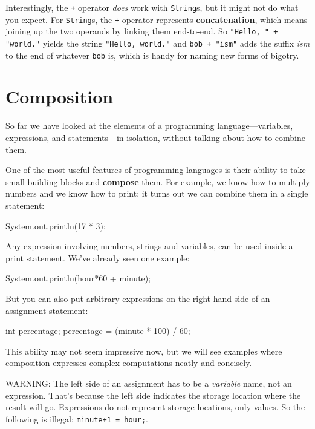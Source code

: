 
Interestingly, the {\tt +} operator {\em does} work with
{\tt String}s, but it might not do what you expect.
For {\tt String}s, the {\tt +} operator represents {\bf concatenation},
which means joining up the two operands by linking them
end-to-end.  So {\tt "Hello, " + "world."} yields the string
{\tt "Hello, world."} and {\tt bob + "ism"} adds the suffix
{\em ism} to the end of whatever {\tt bob} is, which is
handy for naming new forms of bigotry.


\section{Composition}

So far we have looked at the elements of a programming
language---variables, expressions, and statements---in
isolation, without talking about how to combine them.

One of the most useful features of programming languages
is their ability to take small building blocks and
{\bf compose} them.  For example, we know how to multiply
numbers and we know how to print; it turns out we can
combine them in a single statement:

\begin{code}
    System.out.println(17 * 3);
\end{code}
%
Any expression involving numbers, strings
and variables, can be used inside a print statement.  We've
already seen one example:

\begin{code}
    System.out.println(hour*60 + minute);
\end{code}
%
But you can also put arbitrary expressions on the right-hand
side of an assignment statement:

\begin{code}
    int percentage;
    percentage = (minute * 100) / 60;
\end{code}
%
This ability may not seem impressive now, but we will see
examples where composition
expresses complex computations neatly and concisely.

WARNING: The left side of an assignment
has to be a {\em variable} name, not an expression.
That's because the left side indicates the storage location
where the result will go.  Expressions
do not represent storage locations, only values.  So the
following is illegal:  {\tt minute+1 = hour;}.

